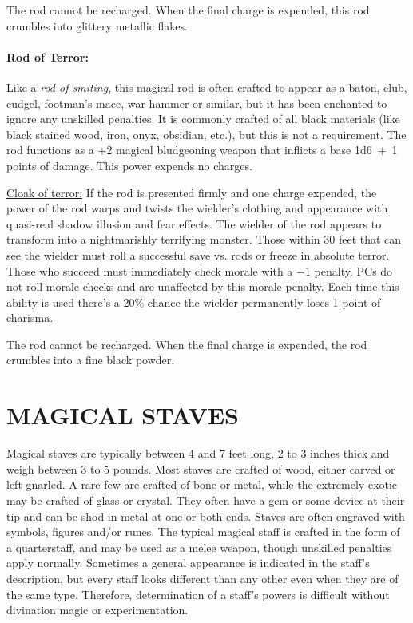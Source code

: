 \begin{multicols}{2}
The rod cannot be recharged.  When the final charge is expended, this rod crumbles into glittery metallic flakes.

\paragraph{Rod of Terror:} Like a \textit{rod of smiting}, this magical rod is often crafted to appear as a baton, club, cudgel, footman's mace, war hammer or similar, but it has been enchanted to ignore any unskilled penalties.  It is commonly crafted of all black materials (like black stained wood, iron, onyx, obsidian, etc.), but this is not a requirement.  The rod functions as a +2 magical bludgeoning weapon that inflicts a base 1d6~+~1 points of damage.  This power expends no charges.

\underline{Cloak of terror:} If the rod is presented firmly and one charge expended, the power of the rod warps and twists the wielder's clothing and appearance with quasi-real shadow illusion and fear effects.  The wielder of the rod appears to transform into a nightmarishly terrifying monster.  Those within 30 feet that can see the wielder must roll a successful save vs. rods or freeze in absolute terror.  Those who succeed must immediately check morale with a $-1$ penalty.  PCs do not roll morale checks and are unaffected by this morale penalty.  Each time this ability is used there's a 20\% chance the wielder permanently loses 1 point of charisma.  

The rod cannot be recharged.  When the final charge is expended, the rod crumbles into a fine black powder.

\section{MAGICAL STAVES}

Magical staves are typically between 4 and 7 feet long, 2 to 3 inches thick and weigh between 3 to 5 pounds.  Most staves are crafted of wood, either carved or left gnarled.  A rare few are crafted of bone or metal, while the extremely exotic may be crafted of glass or crystal.  They often have a gem or some device at their tip and can be shod in metal at one or both ends.  Staves are often engraved with symbols, figures and/or runes.  The typical magical staff is crafted in the form of a quarterstaff, and may be used as a melee weapon, though unskilled penalties apply normally.  Sometimes a general appearance is indicated in the staff's description, but every staff looks different than any other even when they are of the same type.  Therefore, determination of a staff's powers is difficult without divination magic or experimentation. 


\end{multicols}
